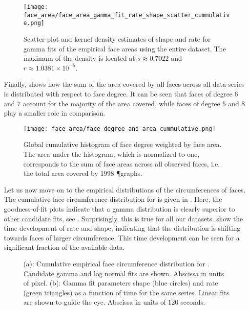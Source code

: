 		\begin{figure}[!htbp]
			\centering
				\texttt{[image: face\_area/face\_area\_gamma\_fit\_rate\_shape\_scatter\_cummulative.png]}
			\caption[Face area distribution fit parameter densities.]{Scatter-plot and kernel density estimates of shape and rate for gamma fits of the empirical face areas using the entire dataset. The maximum of the density is located at $s \approx 0.7022$ and $r \approx 1.0381 \times 10^{-5}$.}
			\label{fig:face_area_kde}
		\end{figure}

		Finally,  shows how the sum of the area covered by all faces across all data series is distributed with respect to face degree. It can be seen that faces of degree $6$ and $7$ account for the majority of the area covered, while faces of degree $5$ and $8$ play a smaller role in comparison. 

		\begin{figure}[!htbp]
			\centering
				\texttt{[image: face\_area/face\_degree\_and\_area\_cummulative.png]}
			\caption[Face degree weighted by face area.]{Global cumulative histogram of face degree weighted by face area. The area under the histogram, which is normalized to one, corresponds to the sum of face areas across all observed faces, i.e. the total area covered by $1998$ \P graphs.}
			\label{fig:face_degree_per_area}
		\end{figure}

		Let us now move on to the empirical distributions of the circumferences of faces. The cumulative face circumference distribution for  is given in . Here, the goodness-of-fit plots indicate  that a gamma distribution is clearly superior to other candidate fits, see . Surprisingly, this is true for all our datasets.  show the time development of rate and shape, indicating that the distribution is shifting towards faces of larger circumference. This time development can be seen for a significant fraction of the available data.

		\begin{figure}
			\centering
			\qquad

			\caption[Face circumference distribution.]{(a): Cumulative empirical face circumference distribution for . Candidate gamma and log normal fits are shown. Abscissa in units of pixel. (b): Gamma fit parameters shape (blue circles) and rate (green triangles) as a function of time for the same series. Linear fits are shown to guide the eye. Abscissa in units of $120$ seconds.}
			\label{fig:face_length_fit}
		\end{figure}

